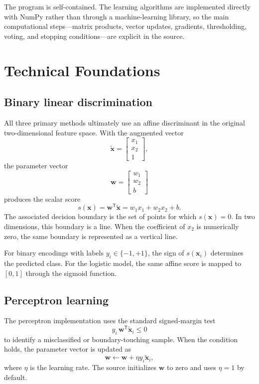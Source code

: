 \documentclass[11pt,a4paper]{article}
\begin{document}
The program is self-contained. The learning algorithms are implemented directly with NumPy rather than through a machine-learning library, so the main computational steps---matrix products, vector updates, gradients, thresholding, voting, and stopping conditions---are explicit in the source.

\section{Technical Foundations}
\subsection{Binary linear discrimination}
All three primary methods ultimately use an affine discriminant in the original two-dimensional feature space. With the augmented vector
\begin{equation}
\tilde{\mathbf{x}} = \begin{bmatrix}x_1\\x_2\\1\end{bmatrix},
\end{equation}
the parameter vector
\begin{equation}
\mathbf{w}=\begin{bmatrix}w_1\\w_2\\b\end{bmatrix}
\end{equation}
produces the scalar score
\begin{equation}
s(\mathbf{x})=\mathbf{w}^{\mathsf T}\tilde{\mathbf{x}}=w_1x_1+w_2x_2+b.
\end{equation}
The associated decision boundary is the set of points for which \(s(\mathbf{x})=0\). In two dimensions, this boundary is a line. When the coefficient of \(x_2\) is numerically zero, the same boundary is represented as a vertical line.

For binary encodings with labels \(y_i\in\{-1,+1\}\), the sign of \(s(\mathbf{x}_i)\) determines the predicted class. For the logistic model, the same affine score is mapped to \([0,1]\) through the sigmoid function.

\subsection{Perceptron learning}
The perceptron implementation uses the standard signed-margin test
\begin{equation}
y_i\,\mathbf{w}^{\mathsf T}\tilde{\mathbf{x}}_i \le 0
\end{equation}
to identify a misclassified or boundary-touching sample. When the condition holds, the parameter vector is updated as
\begin{equation}
\mathbf{w}\leftarrow \mathbf{w}+\eta y_i\tilde{\mathbf{x}}_i,
\end{equation}
where \(\eta\) is the learning rate. The source initializes \(\mathbf{w}\) to zero and uses \(\eta=1\) by default.
\end{document}
